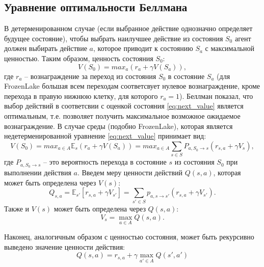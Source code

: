 \documentclass[fleqn, a4paper, 14pt]{article}
\begin{document}
	\subsection{Уравнение оптимальности Беллмана}
	В детерменированном случае (если выбранное действие однозначно определяет будущее состояние), чтобы выбрать наилучшее действие из состояния $S_0$ агент должен выбирать действие $a$, которое приводит к состоянию $ S_a $ с максимальной ценностью. Таким образом, ценность состояния $S_0$:
	\begin{equation}
	V(S_0) = max_{a}(r_a + \gamma V(S_a)),
	\label{eq:next_value}
	\end{equation}
	где $r_a$ -- вознаграждение за переход из состояния $ S_0 $ в состояние  $ S_a $ (для FrozenLake большая всем переходам соответсвует нулевое вознаграждение, кроме перехода в правую нижнюю клетку, для которого $r_a = 1$).
	Беллман показал, что выбор действий в соответсвии с оценкой состояния \eqref{eq:next_value} является оптимальным, т.е. позволяет получить максимальное возможное ожидаемое вознаграждение.
	В случае среды (подобно FrozenLake), которая является недетерменированной уравнение \eqref{eq:next_value} принимает вид:
	\begin{equation}
		V(S_0) = max_{a \in A}\mathbb{E}_s(r_a + \gamma V(S_a))=max_{a \in A}\sum_{s \in S}P_{a,S_0 \rightarrow s}(r_{s,a} + \gamma V_s),
	\end{equation}
	где $ P_{a,S_0 \rightarrow s} $ -- это вероятность перехода в состояние $ s $ из состояния $ S_0 $ при выполнении действия $ a $.
	Введем меру ценности действий $ Q(s,a) $, которая может быть определена через $ V(s) $:
	\begin{equation}
	Q_{s,a} = \mathbb{E}_{s'}[r_{s,a} + \gamma V_{s'}] = \sum_{s' \in S} p_{a,s \rightarrow s'}(r_{s,a} + \gamma V_{s'}).
	\end{equation}
	Также и $ V(s) $ может быть определена через $ Q(s,a) $:
	\begin{equation*}
	V_s = \max_{a \in A} Q(s,a).
	\end{equation*}
	
	Наконец, аналогичным образом с ценностью состояния, может быть рекурсивно выведено значение ценности действия:
	\begin{equation}
	Q(s,a)=r_{s,a} + \gamma \max_{a' \in A}Q(s',a')
	\end{equation}
\end{document}
